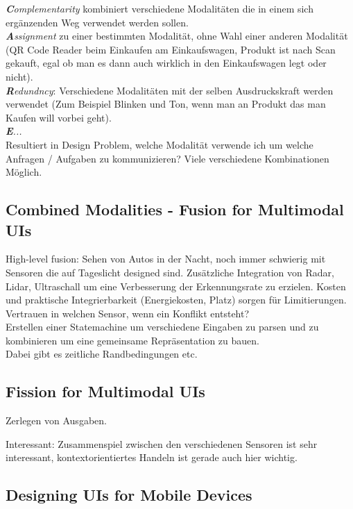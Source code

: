 \textit{\textbf{C}omplementarity} kombiniert verschiedene Modalitäten die in einem sich ergänzenden Weg
verwendet werden sollen.\\
\textit{\textbf{A}ssignment} zu einer bestimmten Modalität, ohne Wahl einer anderen
Modalität (QR Code Reader beim Einkaufen am Einkaufswagen, Produkt ist nach Scan gekauft,
egal ob man es dann auch wirklich in den Einkaufswagen legt oder nicht).\\
\textit{\textbf{R}edundncy}: Verschiedene Modalitäten mit der selben Ausdruckskraft werden 
verwendet (Zum Beispiel Blinken und Ton, wenn man an Produkt das man Kaufen will vorbei
geht).\\ 
\textit{\textbf{E}...}\\

Resultiert in Design Problem, welche Modalität verwende ich um welche Anfragen / Aufgaben 
zu kommunizieren? Viele verschiedene Kombinationen Möglich.

\subsection{Combined Modalities - Fusion for Multimodal UIs}

High-level fusion: Sehen von Autos in der Nacht, noch immer schwierig mit Sensoren die 
auf Tageslicht designed sind. Zusätzliche Integration von Radar, Lidar, Ultraschall um 
eine Verbesserung der Erkennungsrate zu erzielen. Kosten und praktische Integrierbarkeit
(Energiekosten, Platz) sorgen für Limitierungen.\\
Vertrauen in welchen Sensor, wenn ein Konflikt entsteht? \\
Erstellen einer Statemachine um verschiedene Eingaben zu parsen und zu kombinieren
um eine gemeinsame Repräsentation zu bauen. \\
Dabei gibt es zeitliche Randbedingungen etc.\\

\subsection{Fission for Multimodal UIs}

Zerlegen von Ausgaben.

Interessant: Zusammenspiel zwischen den verschiedenen Sensoren ist sehr interessant, kontextorientiertes Handeln ist gerade auch hier wichtig.

\subsection{Designing UIs for Mobile Devices}

